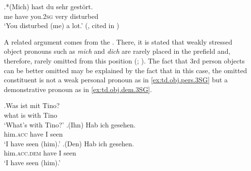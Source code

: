 \exg.*(Mich) hast du sehr gestört.\label{ex:cardinaletti.1sg}\\
me have you.\textsc{2sg} very disturbed\\
`You disturbed (me) a lot.' (\cite[79]{cardinaletti1990}, cited in \cite[70]{mornsjo2002})

A related argument comes from the \citet{duden2016, duden2022}.
There, it is stated that weakly stressed object pronouns such as \textit{mich} and \textit{dich} are rarely placed in the prefield and, therefore, rarely omitted from this position (\cite[§1378]{duden2016}; \cite[§35]{duden2022}).
The fact that 3rd person objects can be better omitted may be explained by the fact that in this case, the omitted constituent is not a weak personal pronoun as in \ref{ex:td.obj.pers.3SG} but a demonstrative pronoun as in \ref{ex:td.obj.dem.3SG}.

\exg.\label{ex:td.obj.demonstratives}Was ist mit Tino?\\
what is with Tino\\
`What's with Tino?'
\ag.\label{ex:td.obj.pers.3SG}(Ihn) Hab ich gesehen.\\
him.\textsc{acc} have I seen\\
`I have seen (him).' 
\bg.\label{ex:td.obj.dem.3SG}(Den) Hab ich gesehen.\\
him.\textsc{acc.dem} have I seen\\
`I have seen (him).' 


\largerpage[-2]

